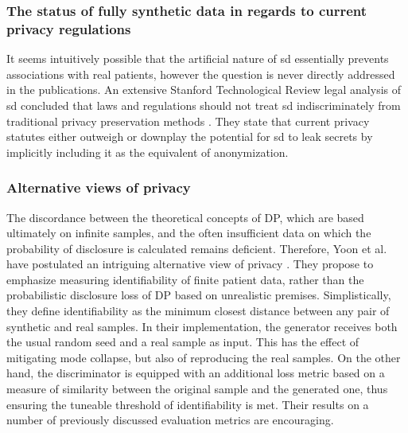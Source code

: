         \subsubsection{The status of fully synthetic data in regards to current privacy regulations}
        
            It seems intuitively possible that the artificial nature of \gls{sd} essentially prevents associations with real patients, however the question is never directly addressed in the publications. An extensive Stanford Technological Review legal analysis of \gls{sd} concluded that laws and regulations should not treat \gls{sd} indiscriminately from traditional privacy preservation methods \cite{bellovin2019privacy}. They state that current privacy statutes either outweigh or downplay the potential for \gls{sd} to leak secrets by implicitly including it as the equivalent of anonymization. 
    
        \subsubsection{Alternative views of privacy}
        
            The discordance between the theoretical concepts of DP, which are  based ultimately on infinite samples, and the often insufficient data on which the probability of disclosure is calculated remains deficient. Therefore, Yoon et al. have postulated an intriguing alternative view of privacy \cite{Yoon2020-anon}. They propose to emphasize measuring identifiability of finite patient data, rather than the probabilistic disclosure loss of DP based on unrealistic premises. Simplistically, they define identifiability as the minimum closest distance between any pair of synthetic and real samples. In their implementation, the generator receives both the usual random seed and a real sample as input. This has the effect of mitigating mode collapse, but also of reproducing the real samples. On the other hand, the discriminator is equipped with an additional loss metric based on a measure of similarity between the original sample and the generated one, thus ensuring the tuneable threshold of identifiability is met. Their results on a number of previously discussed evaluation metrics are encouraging.\par
            
